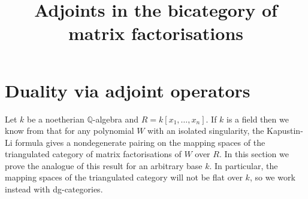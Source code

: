 \documentclass{compositio}
\theoremstyle{definition}
\numberwithin{equation}{section}
\def\Res{\res\!}
\def\res{\operatorname{Res}}
\begin{document}
\def\Res{\res\!}
\newcommand{\cat}[1]{\mathcal{#1}}
\newcommand{\lto}{\longrightarrow}
\newcommand{\xlto}[1]{\stackrel{#1}\lto}
\newcommand{\mf}[1]{\mathfrak{#1}}
\newcommand{\md}[1]{\mathscr{#1}}
\newcommand{\intvar}{\bs{x}_{\textup{int}}}
\newcommand{\extvar}{\bs{x}_{\textup{ext}}}
\newcommand{\qderu}[2]{\mathbf{D}^{#1}(#2)}
\newcommand{\ud}{\mathrm{d}}
\def\l{\,|\,}
\def\cf{\boldsymbol{cf}}
\def\bx{\boldsymbol{x}}
\def\by{\boldsymbol{y}}
\def\ba{\boldsymbol{a}}
\def\bb{\boldsymbol{b}}
\def\totimes{\otimes}
\def\di{Q}
\newcommand{\cotimes}[1]{\,\widehat{\otimes}_{#1}\,}
\def\QQ{\mathds{Q}}
\def\krc{C}
\def\diffm{d}
\def\diffh{d_{\chi}}
\def\ZZ{\mathds{Z}}
\def\bs{\boldsymbol}
\def\Ztwo{\mathds{Z}_2}
\def\mdual{^{\vee}}
\def\KR{\operatorname{KR}}
\def\I{\!\operatorname{i}\!}
\def\E{\operatorname{e}\!}
\def\sln{\mathfrak{sl}(N)}
\def\nN{\mathds{N}}
\def\nZ{\mathds{Z}}
\def\nQ{\mathds{Q}}
\def\nR{\mathds{R}}
\def\nC{\mathds{C}}
\def\Ae{A^{\operatorname{e}}}
\def\ul{\underline}
\def\ori{o}
\def\dual{\lor}

\title{Adjoints in the bicategory of matrix factorisations}

\maketitle

\section{Duality via adjoint operators}\label{section:dualityadjointop}

Let $k$ be a noetherian $\mathbb{Q}$-algebra and $R = k[x_1,\ldots,x_n]$. If $k$ is a field then we know from \cite{??,??} that for any polynomial $W$ with an isolated singularity, the Kapustin-Li formula gives a nondegenerate pairing on the mapping spaces of the triangulated category of matrix factorisations of $W$ over $R$. In this section we prove the analogue of this result for an arbitrary base $k$. In particular, the mapping spaces of the triangulated category will not be flat over $k$, so we work instead with dg-categories.
\end{document}
